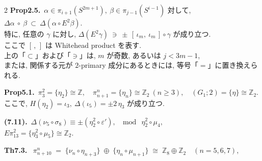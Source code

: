 \documentclass[10pt, leqno]{ltjsarticle}
\newcommand{\gen}[1]{\{#1\}}       %
\newcommand{\pit}[2]{\pi_{#1}^{#2}}
\numberwithin{equation}{section}
\theoremstyle{plain}
\theoremstyle{definition}
\theoremstyle{remark}
\begin{document}
\begin{paracol}{2}
\noindent
\textbf{Prop2.5.}\
$\alpha\in\pi_{i+1}(S^{2m+1}), \ \beta\in \pi_{j-1}(S^{i-1})$ 対して, 
\(
\Delta\alpha\ \circ\ \beta\ \subset\ \Delta(\alpha\circ E^2\beta).
\)\\
特に, 任意の $\gamma$ に対し,
\(
\Delta(E^2\gamma)\ \ni\ \pm\,[\,\iota_m,\ \iota_m\,]\circ\gamma
\)
が成り立つ. \\
ここで $[\, ,\,]$ は Whitehead product を表す. \\
上の「$\subset$」および「$\ni$」は, $m$ が奇数, 
あるいは $j<3m-1$, \\
または, 関係する元が \(2\)-primary 成分にあるときには, 
等号「$=$」に置き換えられる. 

\noindent
\textbf{Prop5.1.}\
\(\pi^{2}_{3}=\gen{\eta_2}\cong\mathbb Z,\quad
\pi^{n}_{n+1}=\gen{\eta_n}\cong\mathbb Z_2\ (n\ge3),\quad
(G_1;2)=\gen{\eta}\cong\mathbb Z_2.\) \\
ここで, 
\(H(\eta_2)=\iota_3,\ \Delta(\iota_5)=\pm 2\,\eta_3\) が成り立つ. 

\noindent
\textbf{(7.11).}\
\(\Delta(\nu_{5}\circ\sigma_{8})\equiv\pm(\eta_{2}^{2}\circ \varepsilon'),\
\mod\ \eta_{2}^{2}\circ\mu_{4},\) \\
\(E\pit{13}{2}=\gen{\eta_{3}^{2}\circ\mu_{5}}\cong\mathbb Z_{2}. \)

\noindent
\textbf{Th7.3.}\
\(\pit{n+10}{n} \;=\; \gen{\nu_{n}\circ \eta_{n+3}} \;\oplus\; \gen{\eta_{n}\circ \mu_{n+1}}
  \;\cong\; \mathbb Z_{8}\oplus\mathbb Z_{2}\quad (n=5,6,7),\)


\end{paracol}
\end{document}
